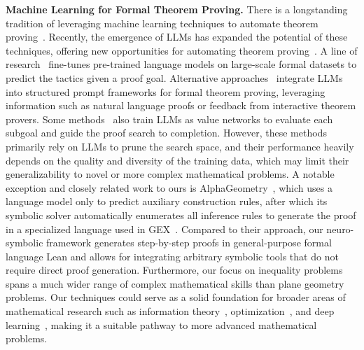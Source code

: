 \textbf{Machine Learning for Formal Theorem Proving. } 
There is a longstanding tradition of leveraging machine learning techniques to automate theorem proving~\citep{urban2008malarea, gauthier2017learning, zhang2021online, piotrowski2023machine, blaauwbroek2024graph2tac}.
Recently,
the emergence of LLMs has expanded the potential of these techniques, offering new opportunities for automating theorem proving~\citep{li2024survey, yang2024formal}. A line of research~\citep{gptf, wu2021int, pact, baldur, yang2023leandojo, deepseekprover, lin2025goedel} fine-tunes pre-trained language models on large-scale formal datasets to predict the tactics given a proof goal. Alternative approaches~\citep{jiang2023draft, lego, denigma, lyra, thakur2024an} integrate LLMs into structured prompt frameworks for formal theorem proving, leveraging information such as natural language proofs or feedback from interactive theorem provers. Some methods~\citep{gptf, htps, curriculum_learning, dt-solver, wei2024proving} also train LLMs as value networks to evaluate each subgoal and guide the proof search to completion. However, these methods primarily rely on LLMs to prune the search space, and their performance heavily depends on the quality and diversity of the training data, which may limit their generalizability to novel or more complex mathematical problems. 
A notable exception and closely related work to ours is AlphaGeometry~\citep{alphageometry}, which uses a language model only to predict auxiliary construction rules, after which its symbolic solver automatically enumerates all inference rules to generate the proof in a specialized language used in GEX~\citep{gex}. Compared to their approach, our neuro-symbolic framework generates step-by-step proofs in general-purpose formal language Lean and allows for integrating arbitrary symbolic tools that do not require direct proof generation. Furthermore, our focus on inequality problems spans a much wider range of complex mathematical skills than plane geometry problems. Our techniques could serve as a solid foundation for broader areas of mathematical research such as information theory~\citep{dembo1991information}, optimization~\citep{nesterov2013introductory}, and deep learning~\citep{roberts2022principles}, making it a suitable pathway to more advanced mathematical problems.
